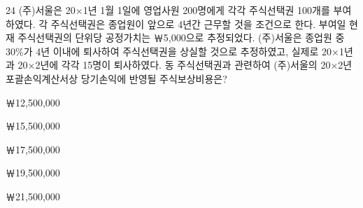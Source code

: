 \begin{question}{24}
(주)서울은 20×1년 1월 1일에 영업사원 200명에게 각각 주식선택권 100개를 부여하였다. 각 주식선택권은 종업원이 앞으로 4년간 근무할 것을 조건으로 한다. 부여일 현재 주식선택권의 단위당 공정가치는 ￦5,000으로 추정되었다. (주)서울은 종업원 중 30\%가 4년 이내에 퇴사하여 주식선택권을 상실할 것으로 추정하였고, 실제로 20×1년과 20×2년에 각각 15명이 퇴사하였다. 동 주식선택권과 관련하여 (주)서울의 20×2년 포괄손익계산서상 당기손익에 반영될 주식보상비용은?
\begin{choices}
  \item ￦12,500,000
  \item ￦15,500,000
  \item ￦17,500,000
  \item ￦19,500,000
  \item ￦21,500,000
\end{choices}
\end{question}

